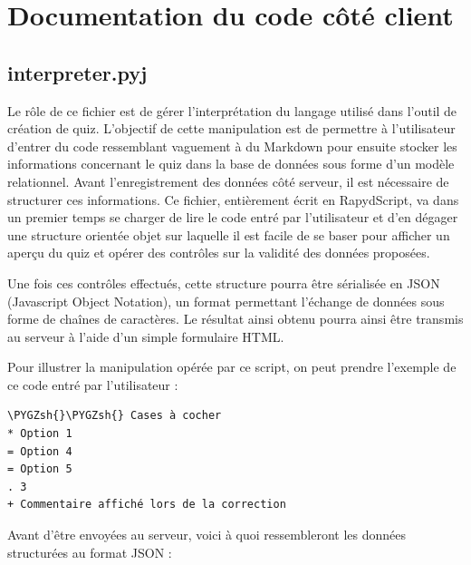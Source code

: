 \documentclass[a4,10pt,french]{sphinxmanual}
\def\PYGZsh{\char`\#}
\begin{document}
\chapter{Documentation du code côté client}
\label{front-end::doc}\label{front-end:documentation-du-code-cote-client}

\section{interpreter.pyj}
\label{front-end:interpreter-pyj}
Le rôle de ce fichier est de gérer l'interprétation du langage utilisé dans l'outil
de création de quiz. L'objectif de cette manipulation est de permettre à l'utilisateur
d'entrer du code ressemblant vaguement à du Markdown pour ensuite stocker les informations
concernant le quiz dans la base de données sous forme d'un modèle relationnel. Avant l'enregistrement
des données côté serveur, il est nécessaire de structurer ces informations. Ce fichier,
entièrement écrit en RapydScript, va dans un premier temps se charger de lire le code entré par l'utilisateur
et d'en dégager une structure orientée objet sur laquelle il est facile de se baser
pour afficher un aperçu du quiz et opérer des contrôles sur la validité des données
proposées.

Une fois ces contrôles effectués, cette structure pourra être sérialisée
en JSON (Javascript Object Notation), un format permettant l'échange de données sous
forme de chaînes de caractères. Le résultat ainsi obtenu pourra ainsi être
transmis au serveur à l'aide d'un simple formulaire HTML.

Pour illustrer la manipulation opérée par ce script, on peut prendre l'exemple
de ce code entré par l'utilisateur :

\begin{Verbatim}[commandchars=\\\{\}]
\PYGZsh{}\PYGZsh{} Cases à cocher
* Option 1
= Option 4
= Option 5
. 3
+ Commentaire affiché lors de la correction
\end{Verbatim}

Avant d'être envoyées au serveur, voici à quoi ressembleront les données structurées
au format JSON :
\end{document}
